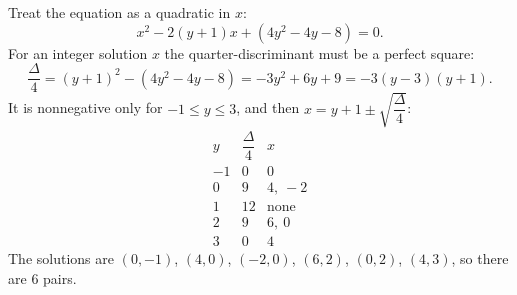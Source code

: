 Treat the equation as a quadratic in $x$:
\[
x^2-2(y+1)x+\left(4y^2-4y-8\right)=0 .
\]
For an integer solution $x$ the quarter-discriminant must be a perfect square:
\[
\dfrac{\Delta}{4}=(y+1)^2-\left(4y^2-4y-8\right)=-3y^2+6y+9=-3(y-3)(y+1).
\]
It is nonnegative only for $-1\le y\le3$, and then $x=y+1\pm\sqrt{\dfrac{\Delta}{4}}$:
\[
\begin{array}{c|c|c}
y & \dfrac{\Delta}{4} & x\\\hline
-1 & 0 & 0\\
0 & 9 & 4,\ -2\\
1 & 12 & \text{none}\\
2 & 9 & 6,\ 0\\
3 & 0 & 4
\end{array}
\]
The solutions are $(0,-1)$, $(4,0)$, $(-2,0)$, $(6,2)$, $(0,2)$, $(4,3)$, so there are $\boxed{6}$ pairs.

